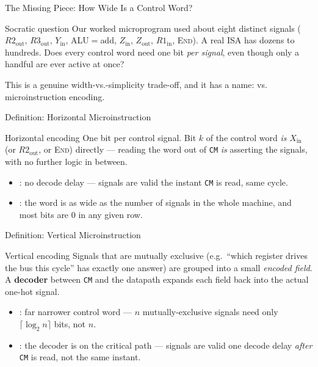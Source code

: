 \documentclass[aspectratio=169]{beamer}
\begin{document}
\begin{frame}{The Missing Piece: How Wide Is a Control Word?}
  \begin{block}{Socratic question}
    Our worked microprogram used about eight distinct signals ($R2_{\text{out}}$,
    $R3_{\text{out}}$, $Y_{\text{in}}$, ALU$=$add, $Z_{\text{in}}$,
    $Z_{\text{out}}$, $R1_{\text{in}}$, \textsc{End}). A real ISA has dozens to
    hundreds. Does every control word need one bit \emph{per signal}, even
    though only a handful are ever active at once?
  \end{block}
  This is a genuine width-vs.-simplicity trade-off, and it has a name:
   vs.\  microinstruction encoding.
\end{frame}

\begin{frame}{Definition: Horizontal Microinstruction}
  \begin{block}{Horizontal encoding}
    One bit per control signal. Bit $k$ of the control word \emph{is}
    $X_{\text{in}}$ (or $R2_{\text{out}}$, or \textsc{End}) directly ---
    reading the word out of \texttt{CM} \emph{is} asserting the signals, with
    no further logic in between.
  \end{block}
  \begin{itemize}
    \item {}: no decode delay --- signals are valid the instant
      \texttt{CM} is read, same cycle.
    \item {}: the word is as wide as the number of signals in the whole
      machine, and most bits are 0 in any given row.
  \end{itemize}
\end{frame}

\begin{frame}{Definition: Vertical Microinstruction}
  \begin{block}{Vertical encoding}
    Signals that are mutually exclusive (e.g.\ ``which register drives the
    bus this cycle'' has exactly one answer) are grouped into a small
    \emph{encoded field}. A \textbf{decoder} between \texttt{CM} and the
    datapath expands each field back into the actual one-hot signal.
  \end{block}
  \begin{itemize}
    \item {}: far narrower control word --- $n$ mutually-exclusive
      signals need only $\lceil \log_2 n \rceil$ bits, not $n$.
    \item {}: the decoder is on the critical path --- signals are valid
      one decode delay \emph{after} \texttt{CM} is read, not the same instant.
  \end{itemize}
\end{frame}
\end{document}
